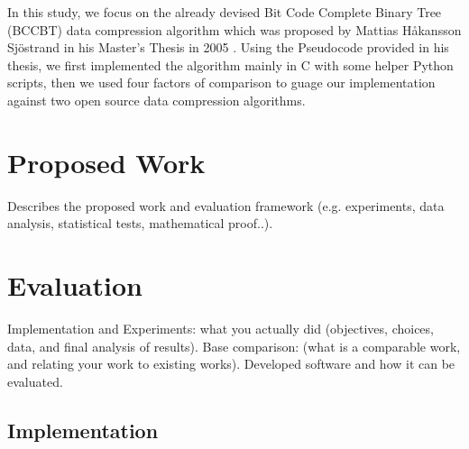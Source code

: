 \documentclass[12pt]{IEEEtran}
\begin{document}
In this study, we focus on the already devised Bit Code Complete Binary Tree (BCCBT) data compression algorithm
which was
proposed by Mattias Håkansson Sjöstrand in his Master's Thesis in 2005 \cite{Sjostrand}.
Using the Pseudocode provided in
his thesis, we first implemented the algorithm mainly in C with some helper Python scripts, then we used four factors of comparison
to guage our implementation against two open source data compression algorithms.

\section{Proposed Work}
Describes the proposed work and evaluation framework (e.g. experiments, data analysis, statistical tests, mathematical proof..).


\section{Evaluation}
Implementation and Experiments: what you actually did (objectives, choices, data, and final analysis of results).
Base comparison: (what is a comparable work, and relating your work to existing works).
Developed software and how it can be evaluated.

\subsection{Implementation}
\end{document}
